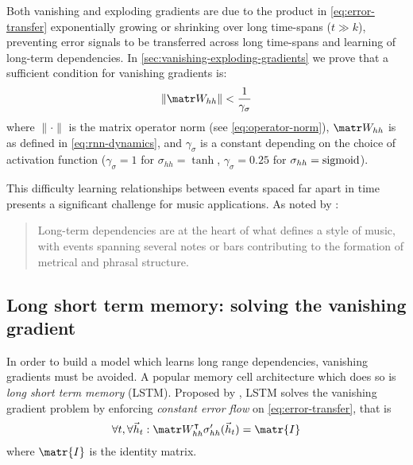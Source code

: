 Both vanishing and exploding gradients are due to the product in
\cref{eq:error-transfer} exponentially growing or shrinking over long
time-spans (\ie $t \gg k$), preventing error signals to be transferred across
long time-spans and learning of long-term dependencies. In
\vref{sec:vanishing-exploding-gradients} we prove that a sufficient condition
for vanishing gradients is:
\begin{equation}\label{eq:vanishing-gradients-suff}
  \left\| \W_{hh} \right\| < \frac{1}{\gamma_\sigma}
\end{equation}
where $\| \cdot \|$ is the matrix operator norm (see \vref{eq:operator-norm}),
$\W_{hh}$ is as defined in \vref{eq:rnn-dynamics},
and $\gamma_\sigma$ is a constant depending on the choice of activation function
(\eg $\gamma_\sigma = 1$ for $\sigma_{hh} = \tanh$, $\gamma_\sigma = 0.25$ for
$\sigma_{hh} = \operatorname*{sigmoid}$).

This difficulty learning relationships between events spaced far apart in time
presents a significant challenge for music applications. As noted by
\citet{cooper1963rhythmic}:
\begin{quote}
  Long-term dependencies are at the heart of what defines a style of music, with
  events spanning several notes or bars contributing to the formation of metrical and phrasal
  structure.
\end{quote}

\subsection{Long short term memory: solving the vanishing gradient}\label{sec:LSTM}


In order to build a model which learns long range dependencies, vanishing
gradients must be avoided. A popular memory cell architecture which does so is
\emph{long short term memory} (LSTM). Proposed by \citet{hochreiter1997long},
LSTM solves the vanishing gradient problem by enforcing \emph{constant error
flow} on \cref{eq:error-transfer}, that is
\begin{equation}\label{eq:const-err-flow}
    \forall t, \forall \h_t: \W_{hh}^\tp \sigma_{hh}' (\h_{t}) = \matr{I}
\end{equation}
where $\matr{I}$ is the identity matrix.

